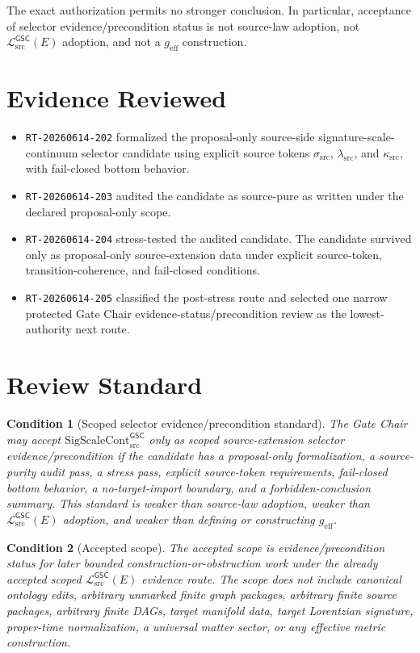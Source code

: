 \documentclass[11pt]{article}
\newcommand{\MetricData}{\mathcal{L}_{\mathrm{src}}^{\mathsf{GSC}}}
\newcommand{\geff}{g_{\mathrm{eff}}}
\newcommand{\SigScaleCont}{\mathrm{SigScaleCont}_{\mathrm{src}}^{\mathsf{GSC}}}
\newcommand{\SigTok}{\sigma_{\mathrm{src}}}
\newcommand{\ScaleTok}{\lambda_{\mathrm{src}}}
\newcommand{\ContTok}{\kappa_{\mathrm{src}}}
\newtheorem{condition}{Condition}
\begin{document}
The exact authorization permits no stronger conclusion. In particular,
acceptance of selector evidence/precondition status is not source-law adoption,
not \(\MetricData(E)\) adoption, and not a \(\geff\) construction.

\section{Evidence Reviewed}

\begin{itemize}[leftmargin=*]
  \item \texttt{RT-20260614-202} formalized the proposal-only source-side
  signature-scale-continuum selector candidate using explicit source tokens
  \(\SigTok\), \(\ScaleTok\), and \(\ContTok\), with fail-closed bottom
  behavior.
  \item \texttt{RT-20260614-203} audited the candidate as source-pure as
  written under the declared proposal-only scope.
  \item \texttt{RT-20260614-204} stress-tested the audited candidate. The
  candidate survived only as proposal-only source-extension data under explicit
  source-token, transition-coherence, and fail-closed conditions.
  \item \texttt{RT-20260614-205} classified the post-stress route and selected
  one narrow protected Gate Chair evidence-status/precondition review as the
  lowest-authority next route.
\end{itemize}

\section{Review Standard}

\begin{condition}[Scoped selector evidence/precondition standard]
The Gate Chair may accept \(\SigScaleCont\) only as scoped source-extension
selector evidence/precondition if the candidate has a proposal-only
formalization, a source-purity audit pass, a stress pass, explicit source-token
requirements, fail-closed bottom behavior, a no-target-import boundary, and a
forbidden-conclusion summary. This standard is weaker than source-law
adoption, weaker than \(\MetricData(E)\) adoption, and weaker than defining or
constructing \(\geff\).
\end{condition}

\begin{condition}[Accepted scope]
The accepted scope is evidence/precondition status for later bounded
construction-or-obstruction work under the already accepted scoped
\(\MetricData(E)\) evidence route. The scope does not include canonical
ontology edits, arbitrary unmarked finite graph packages, arbitrary finite
source packages, arbitrary finite DAGs, target manifold data, target Lorentzian
signature, proper-time normalization, a universal matter sector, or any
effective metric construction.
\end{condition}
\end{document}
